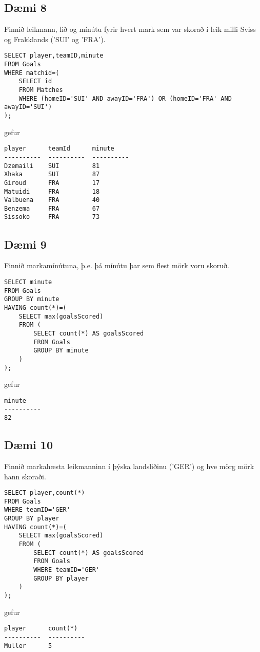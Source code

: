 \subsection*{Dæmi 8}
Finnið leikmann, lið og mínútu fyrir hvert mark sem var skorað í leik milli Sviss og Frakklands ('SUI' og 'FRA').

\lausn
\begin{lstlisting}
SELECT player,teamID,minute
FROM Goals
WHERE matchid=(
	SELECT id
	FROM Matches
	WHERE (homeID='SUI' AND awayID='FRA') OR (homeID='FRA' AND awayID='SUI')
);
\end{lstlisting}
gefur
\begin{Verbatim}[frame=single]
player      teamId      minute
----------  ----------  ----------
Dzemaili    SUI         81
Xhaka       SUI         87
Giroud      FRA         17
Matuidi     FRA         18
Valbuena    FRA         40
Benzema     FRA         67
Sissoko     FRA         73
\end{Verbatim}

\subsection*{Dæmi 9}
Finnið markamínútuna, þ.e. þá mínútu þar sem flest mörk voru skoruð.

\lausn
\begin{lstlisting}
SELECT minute
FROM Goals
GROUP BY minute
HAVING count(*)=(
	SELECT max(goalsScored)
	FROM (
		SELECT count(*) AS goalsScored
		FROM Goals
		GROUP BY minute
	)
);
\end{lstlisting}
gefur
\begin{Verbatim}[frame=single]
minute
----------
82
\end{Verbatim}

\subsection*{Dæmi 10}
Finnið markahæsta leikmanninn í þýska landsliðinu ('GER') og hve mörg mörk hann skoraði.

\lausn
\begin{lstlisting}
SELECT player,count(*)
FROM Goals
WHERE teamID='GER'
GROUP BY player
HAVING count(*)=(
	SELECT max(goalsScored)
	FROM (
		SELECT count(*) AS goalsScored
		FROM Goals
		WHERE teamID='GER'
		GROUP BY player
	)
);
\end{lstlisting}
gefur
\begin{Verbatim}[frame=single]
player      count(*)
----------  ----------
Muller      5
\end{Verbatim}

